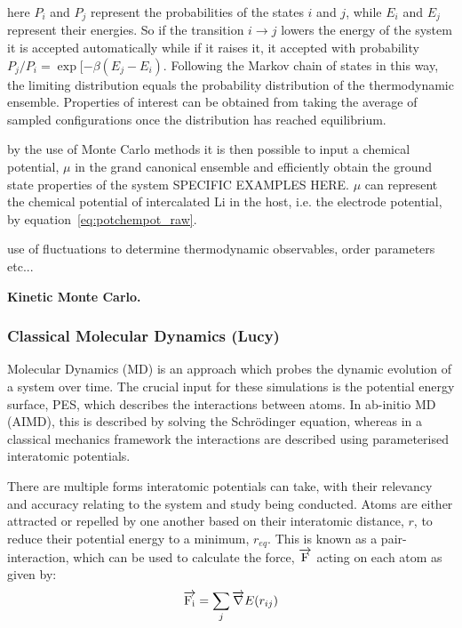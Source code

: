 \documentclass[journal=jacsat,manuscript=article]{achemso}
\begin{document}
here $P_{i}$ and $P_{j}$ represent the probabilities of the states $i$ and $j$, while $E_{i}$ and $E_{j}$ represent their energies. So if the transition $i \rightarrow j$ lowers the energy of the system it is accepted automatically while if it raises it, it accepted with probability $P_{j}/P_{i} = \exp[-{\beta}({E_{j}-E_{i}})$. Following the Markov chain of states in this way, the limiting distribution equals the probability distribution of the thermodynamic ensemble. Properties of interest can be obtained from taking the average of sampled configurations once the distribution has reached equilibrium.

by the use of Monte Carlo methods it is then possible to input a chemical potential, $\mu$ in the grand canonical ensemble and efficiently obtain the ground state properties of the system SPECIFIC EXAMPLES HERE. $\mu$ can represent the chemical potential of intercalated Li in the host, i.e. the electrode potential, by equation~\ref{eq:potchempot_raw}.

use of fluctuations to determine thermodynamic observables, order parameters etc...

\textbf{Kinetic Monte Carlo.}

\subsubsection{Classical Molecular Dynamics (Lucy)}
\label{sec:molecular_dynamics}
Molecular Dynamics (MD) is an approach which probes the dynamic evolution of a system over time. The crucial input for these simulations is the potential energy surface, PES, which describes the interactions between atoms. In ab-initio MD (AIMD), this is described by solving the Schr\"{o}dinger equation, whereas in a classical mechanics framework the interactions are described using parameterised interatomic potentials.

There are multiple forms interatomic potentials can take, with their relevancy and accuracy relating to the system and study being conducted. Atoms are either attracted or repelled by one another based on their interatomic distance, $r$, to reduce their potential energy to a minimum, $r_{eq}$. This is known as a pair-interaction, which can be used to calculate the force, $\overrightarrow{\rm F}$ acting on each atom as given by:
\begin{equation}
    \overrightarrow{\rm F_i} = \sum_j {\overrightarrow{\nabla}}E(r_{ij})
\end{equation}
\end{document}
